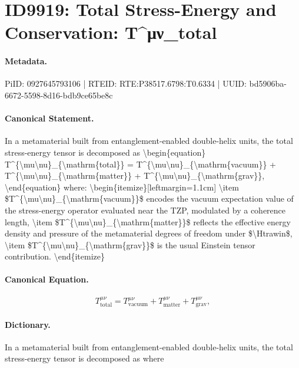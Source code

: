 \section*{ID9919: Total Stress-Energy and Conservation: T\textasciicircum{}μν\_total}
\paragraph{Metadata.}
PiID: 0927645793106 | RTEID: RTE:P38517.6798:T0.6334 | UUID: bd5906ba-6672-5598-8d16-bdb9ce65be8c

\paragraph{Canonical Statement.}
In a metamaterial built from entanglement-enabled double-helix units, the total stress-energy tensor is decomposed as \textbackslash{}begin\{equation\} T\textasciicircum{}\{\textbackslash{}mu\textbackslash{}nu\}\_\{\textbackslash{}mathrm\{total\}\} = T\textasciicircum{}\{\textbackslash{}mu\textbackslash{}nu\}\_\{\textbackslash{}mathrm\{vacuum\}\} + T\textasciicircum{}\{\textbackslash{}mu\textbackslash{}nu\}\_\{\textbackslash{}mathrm\{matter\}\} + T\textasciicircum{}\{\textbackslash{}mu\textbackslash{}nu\}\_\{\textbackslash{}mathrm\{grav\}\}, \textbackslash{}end\{equation\} where: \textbackslash{}begin\{itemize\}[leftmargin=1.1cm] \textbackslash{}item \$T\textasciicircum{}\{\textbackslash{}mu\textbackslash{}nu\}\_\{\textbackslash{}mathrm\{vacuum\}\}\$ encodes the vacuum expectation value of the stress-energy operator evaluated near the TZP, modulated by a coherence length, \textbackslash{}item \$T\textasciicircum{}\{\textbackslash{}mu\textbackslash{}nu\}\_\{\textbackslash{}mathrm\{matter\}\}\$ reflects the effective energy density and pressure of the metamaterial degrees of freedom under \$\textbackslash{}Htrawin\$, \textbackslash{}item \$T\textasciicircum{}\{\textbackslash{}mu\textbackslash{}nu\}\_\{\textbackslash{}mathrm\{grav\}\}\$ is the usual Einstein tensor contribution. \textbackslash{}end\{itemize\}

\paragraph{Canonical Equation.}
\[
T^{\mu\nu}_{\mathrm{total}} = T^{\mu\nu}_{\mathrm{vacuum}} + T^{\mu\nu}_{\mathrm{matter}} + T^{\mu\nu}_{\mathrm{grav}},
\]

\paragraph{Dictionary.}
In a metamaterial built from entanglement-enabled double-helix units, the total stress-energy tensor is decomposed as where

